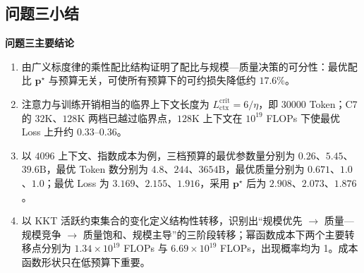 \subsection{问题三小结}

\begin{conclusionbox}
\textbf{问题三主要结论}
\begin{enumerate}
\item 由广义标度律的乘性配比结构证明了配比与规模—质量决策的可分性：最优配比 $\boldsymbol p^\star$ 与预算无关，可使所有预算下的可约损失降低约 $17.6\%$。
\item 注意力与训练开销相当的临界上下文长度为 $L_{\mathrm{ctx}}^{\mathrm{crit}}=6/\eta$，即 $30000$ Token；C7 的 $32\mathrm{K}$、$128\mathrm{K}$ 两档已越过临界点，$128\mathrm{K}$ 上下文在 $10^{19}$ FLOPs 下使最优 Loss 上升约 $0.33$--$0.36$。
\item 以 $4096$ 上下文、指数成本为例，三档预算的最优参数量分别为 $0.26$、$5.45$、$39.6\mathrm{B}$，最优 Token 数分别为 $4.8$、$244$、$3654\mathrm{B}$，最优质量分别为 $0.671$、$1.0$、$1.0$；最优 Loss 为 $3.169$、$2.155$、$1.916$，采用 $\boldsymbol p^\star$ 后为 $2.908$、$2.073$、$1.876$。
\item 以 KKT 活跃约束集合的变化定义结构性转移，识别出“规模优先 $\to$ 质量—规模竞争 $\to$ 质量饱和、规模主导”的三阶段转移；幂函数成本下两个主要转移点分别为 $1.34\times10^{19}$ FLOPs 与 $6.69\times10^{19}$ FLOPs，出现概率均为 1。成本函数形状只在低预算下重要。
\end{enumerate}
\end{conclusionbox}
